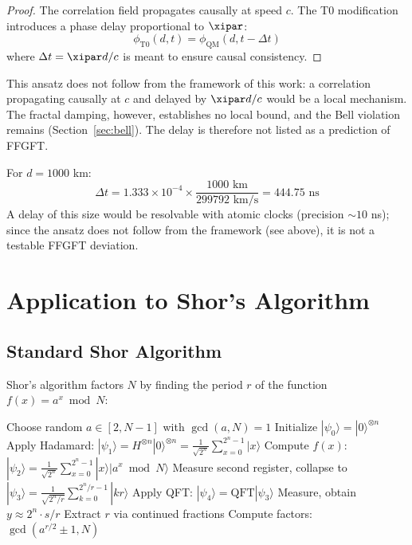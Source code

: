 \begin{proof}
	The correlation field propagates causally at speed $c$. The T0 modification introduces a phase delay proportional to $\xipar$:
	\begin{equation}
		\phi_{\text{T0}}(d, t) = \phi_{\text{QM}}(d, t - \Delta t)
	\end{equation}
	where $\Delta t = \xipar d/c$ is meant to ensure causal consistency.
\end{proof}

This ansatz does not follow from the framework of this work: a correlation propagating causally at $c$ and delayed by $\xipar d/c$ would be a local mechanism. The fractal damping, however, establishes no local bound, and the Bell violation remains (Section~\ref{sec:bell}). The delay is therefore not listed as a prediction of FFGFT.

\begin{experimentbox}
	For $d = 1000$ km:
	\begin{equation}
		\Delta t = 1.333 \times 10^{-4} \times \frac{1000 \text{ km}}{299792 \text{ km/s}} = 444.75 \text{ ns}
	\end{equation}
	A delay of this size would be resolvable with atomic clocks (precision $\sim 10$ ns); since the ansatz does not follow from the framework (see above), it is not a testable FFGFT deviation.
\end{experimentbox}

\section{Application to Shor's Algorithm}
\label{sec:shor}

\subsection{Standard Shor Algorithm}

Shor's algorithm factors $N$ by finding the period $r$ of the function $f(x) = a^x \bmod N$:

\begin{algorithm}[H]
	\caption{Standard Shor Algorithm}
	\begin{algorithmic}[1]
		\STATE Choose random $a \in [2, N-1]$ with $\gcd(a, N) = 1$
		\STATE Initialize $|\psi_0\rangle = |0\rangle^{\otimes n}$
		\STATE Apply Hadamard: $|\psi_1\rangle = H^{\otimes n}|0\rangle^{\otimes n} = \frac{1}{\sqrt{2^n}}\sum_{x=0}^{2^n-1}|x\rangle$
		\STATE Compute $f(x)$: $|\psi_2\rangle = \frac{1}{\sqrt{2^n}}\sum_{x=0}^{2^n-1}|x\rangle|a^x \bmod N\rangle$
		\STATE Measure second register, collapse to $|\psi_3\rangle = \frac{1}{\sqrt{2^n/r}}\sum_{k=0}^{2^n/r-1}|kr\rangle$
		\STATE Apply QFT: $|\psi_4\rangle = \text{QFT}|\psi_3\rangle$
		\STATE Measure, obtain $y \approx 2^n \cdot s/r$
		\STATE Extract $r$ via continued fractions
		\STATE Compute factors: $\gcd(a^{r/2} \pm 1, N)$
	\end{algorithmic}
\end{algorithm}

